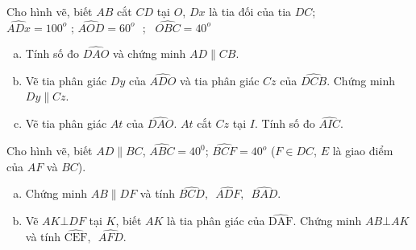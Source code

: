 \begin{bt}
\end{bt}   \begin{bt}
Cho hình vẽ, biết $AB$ cắt $CD$ tại $O$, $Dx$ là tia đối của tia $DC$;$\widehat{ADx}={{100}^{o}}\text{ ; }\widehat{AOD}={{60}^{o}}\text{ };\text{ }\widehat{OBC}={{40}^{o}}$
\begin{enumerate}[a)]
\item	Tính số đo $\widehat{DAO}$ và chứng minh $AD \parallel CB$.
\item	Vẽ tia phân giác $Dy$ của $\widehat{ADO}$ và tia phân giác $Cz$ của $\widehat{DCB}$. Chứng minh $Dy \parallel Cz$.
\item	Vẽ tia phân giác $At$ của $\widehat{DAO}$. $At$ cắt $Cz$ tại $I$. Tính số đo $\widehat{AIC}$.
\end{enumerate}

\end{bt}   \begin{bt}
Cho hình vẽ, biết $AD \parallel BC$, $\widehat{ABC}={{40}^{0}}$; $\widehat{BCF}={{40}^{o}}$ ($F\in DC$, $E$ là giao điểm của $AF$ và $BC$).
\begin{enumerate}[a)]
\item Chứng minh $AB \parallel DF$ và tính $\widehat{BCD},\,\,\,\widehat{ADF},\,\,\,\widehat{BAD}$.
\item Vẽ $AK \bot DF$ tại $K$, biết $AK$ là tia phân giác của $\widehat{\text{DAF}}$. Chứng minh $AB\bot AK$ và tính $\widehat{\text{CEF}},\,\,\,\widehat{AFD}.$
\end{enumerate}

\end{bt}